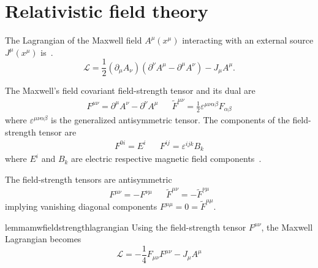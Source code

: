 \section{Relativistic field theory}

\begin{definition}
	The Lagrangian of the Maxwell field $A^\mu(x^\mu)$ interacting with an external source $J^\mu(x^\mu)$ is~\cite[p.~339]{Srednicki2007}.
	\begin{equation}
		\mathcal{L}
		=
		\frac{1}{2}
		(\partial_\mu A_\nu)
		\left(
			\partial^\nu A^\mu
			-
			\partial^\mu A^\nu
		\right)
		-
		J_\mu A^\mu
		\label{eq:mw_lagrangian}
		.
	\end{equation}
\end{definition}
\begin{definition}
	The Maxwell's field covariant field-strength tensor and its dual are
	\begin{align}
		F^{\mu\nu}
		=
		\partial^\mu A^\nu
		-
		\partial^\nu A^\mu
		&&
		\tilde{F}^{\mu\nu}
		=
		\frac{1}{2}
		\varepsilon^{\mu\nu\alpha\beta}
		F_{\alpha\beta}
		\label{eq:mw_field_strength_tensors}
	\end{align}
	where $\varepsilon^{\mu\nu\alpha\beta}$ is the generalized antisymmetric tensor.
	The components of the field-strength tensor are
	\begin{align}
		F^{0i}
		=
		E^i
		&&
		F^{ij}
		=
		\varepsilon^{ijk}B_k
		\label{eq:mw_field_strength_components}
	\end{align}
	where $E^i$ and $B_k$ are electric respective magnetic field components~\cite[p.~20]{Carroll1997}.
\end{definition}
\begin{corollary}
	The field-strength tensors are antisymmetric
	\begin{align}
		F^{\mu\nu}
		=
		-
		F^{\nu\mu}
		&&
		\tilde{F}^{\mu\nu}
		=
		-
		\tilde{F}^{\nu\mu}
	\end{align}
	implying vanishing diagonal components $F^{\mu\mu}=0=\tilde{F}^{\mu\mu}$.
\end{corollary}
\begin{restatable}{lemma}{mwfieldstrengthlagrangian}\label{thm:mw_field_strength_lagrangian}
	Using the field-strength tensor $F^{\mu\nu}$, the Maxwell Lagrangian becomes
	\begin{equation}
		\mathcal{L}
		=
		-
		\frac{1}{4}
		F_{\mu\nu}
		F^{\mu\nu}
		-
		J_\mu A^\mu
		\label{eq:mw_field_strength_lagrangian}
	\end{equation}
\end{restatable}
